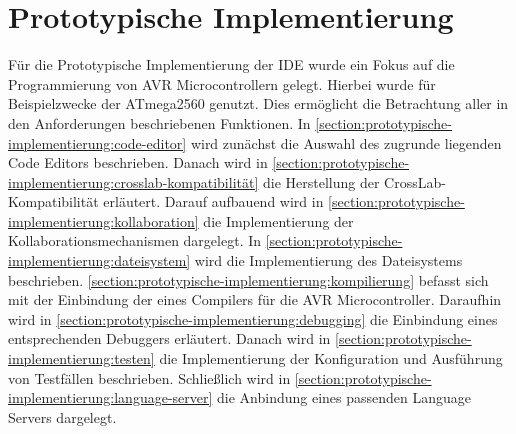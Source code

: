 \chapter{Prototypische Implementierung}\label{section:prototypische-implementierung}




Für die Prototypische Implementierung der IDE wurde ein Fokus auf die Programmierung von AVR Microcontrollern gelegt. Hierbei wurde für Beispielzwecke der ATmega2560 genutzt. Dies ermöglicht die Betrachtung aller in den Anforderungen beschriebenen Funktionen. In \autoref{section:prototypische-implementierung:code-editor} wird zunächst die Auswahl des zugrunde liegenden Code Editors beschrieben. Danach wird in \autoref{section:prototypische-implementierung:crosslab-kompatibilität} die Herstellung der CrossLab-Kompatibilität erläutert. Darauf aufbauend wird in \autoref{section:prototypische-implementierung:kollaboration} die Implementierung der Kollaborationsmechanismen dargelegt. In \autoref{section:prototypische-implementierung:dateisystem} wird die Implementierung des Dateisystems beschrieben. \autoref{section:prototypische-implementierung:kompilierung} befasst sich mit der Einbindung der eines Compilers für die AVR Microcontroller. Daraufhin wird in \autoref{section:prototypische-implementierung:debugging} die Einbindung eines entsprechenden Debuggers erläutert. Danach wird in \autoref{section:prototypische-implementierung:testen} die Implementierung der Konfiguration und Ausführung von Testfällen beschrieben. Schließlich wird in \autoref{section:prototypische-implementierung:language-server} die Anbindung eines passenden Language Servers dargelegt.

